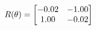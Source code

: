 \documentclass[preview]{standalone}
\begin{document}
\begin{align*}
\special{dvisvgm:raw <g id='unique000'>}R(\theta) = \begin{bmatrix}-0.02 & -1.00\\1.00 & -0.02\end{bmatrix}\special{dvisvgm:raw </g>}
\end{align*}
\end{document}
